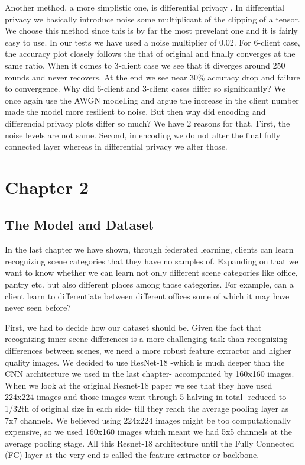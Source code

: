 \documentclass[11pt]{article}
\begin{document}
\par Another method, a more simplistic one, is differential privacy \cite{diff1}\cite{diff2}. In differential privacy we basically introduce noise some multiplicant of the clipping of a tensor. We choose this method since this is by far the most prevelant one and it is fairly easy to use. In our tests we have used a noise multiplier of 0.02. For 6-client case, the accuracy plot closely follows the that of original and finally converges at the same ratio. When it comes to 3-client case we see that it diverges around 250 rounds and never recovers. At the end we see near 30\% accuracy drop and failure to convergence. Why did 6-client and 3-client cases differ so significantly? We once again use the AWGN modelling and argue the increase in the client number made the model more resilient to noise. But then why did encoding and differencial privacy plots differ so much? We have 2 reasons for that. First, the noise levels are not same. Second, in encoding we do not alter the final fully connected layer whereas in differential privacy we alter those.  

\section{Chapter 2}

\subsection{The Model and Dataset}

\par		In the last chapter we have shown, through federated learning, clients can learn recognizing scene categories that they have no samples of. Expanding on that we want to know whether we can learn not only different scene categories like office, pantry etc. but also different places among those categories. For example, can a client learn to differentiate between different offices some of which it may have never seen before?
\par		First, we had to decide how our dataset should be. Given the fact that recognizing inner-scene differences is a more challenging task than recognizing differences between scenes, we need a more robust feature extractor and higher quality images. We decided to use ResNet-18 -which is much deeper than the CNN architecture we used in the last chapter- accompanied by 160x160 images. When we look at the original Resnet-18 paper\cite{resnet18} we see that they have used 224x224 images and those images went through 5 halving in total -reduced to 1/32th of original size in each side- till they reach the average pooling layer as 7x7 channels. We believed using 224x224 images might be too computationally expensive, so we used 160x160 images which meant we had 5x5 channels at the average pooling stage. All this Resnet-18 architecture until the Fully Connected (FC) layer at the very end is called the feature extractor or backbone.
\end{document}
